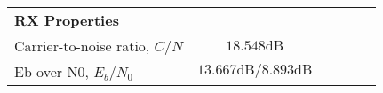 \begin{table}[htbp]
\begin{tabular}{lccccr}
    \rowcolor[rgb]{ 0,  0,  0} \textcolor[rgb]{ 1,  1,  1}{\textbf{RX Properties}}	& \textcolor[rgb]{ 1,  1,  1}{\textbf{}} 		\\
    Carrier-to-noise ratio, $C/N$ 					& $18.548 \text{dB}$										\\
    Eb over N0, $E_b/N_0$ 					& $13.667 \text{dB} / 8.893 \text{dB}$					\\
    \end{tabular}
  \label{tab:link_budget}

\end{table}
